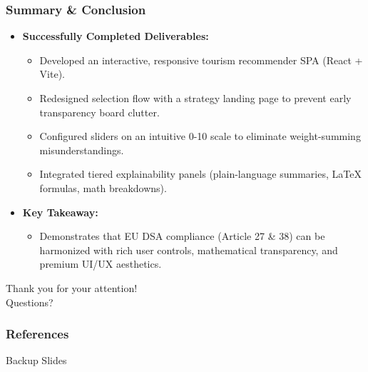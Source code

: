\begin{frame}
    \frametitle{Summary \& Conclusion}
    \begin{itemize}
        \item \textbf{Successfully Completed Deliverables:}
            \begin{itemize}
                \item Developed an interactive, responsive tourism recommender SPA (React + Vite).
                \item Redesigned selection flow with a strategy landing page to prevent early transparency board clutter.
                \item Configured sliders on an intuitive 0-10 scale to eliminate weight-summing misunderstandings.
                \item Integrated tiered explainability panels (plain-language summaries, LaTeX formulas, math breakdowns).
            \end{itemize}
        \item \textbf{Key Takeaway:}
            \begin{itemize}
                \item Demonstrates that EU DSA compliance (Article 27 \& 38) can be harmonized with rich user controls, mathematical transparency, and premium UI/UX aesthetics.
            \end{itemize}
    \end{itemize}
\end{frame}

\PraesentationMasterWeissBlau
\begin{frame}
    \begin{center}
        \huge Thank you for your attention! \\
        \vspace{1em}
        \large Questions?
    \end{center}
\end{frame}

\PraesentationMasterStandard
\begin{frame}[allowframebreaks]
    \frametitle{References}
    \printbibliography
\end{frame}

\PraesentationMasterWeissBlau
\begin{frame}
    \begin{center}
        \huge Backup Slides
    \end{center}
\end{frame}
\PraesentationMasterStandard


